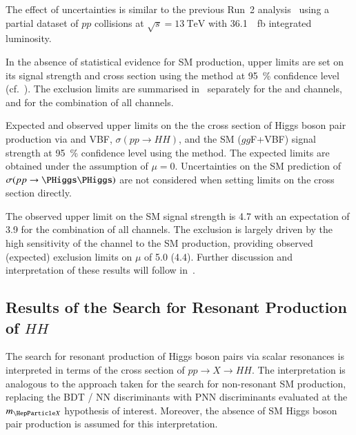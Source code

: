  The effect of
uncertainties is similar to the previous Run~2
analysis~\cite{HIGG-2016-16-witherratum} using a partial dataset of $pp$
collisions at $\sqrt{s} = \SI{13}{\TeV}$ with \SI{36.1}{\per\femto\barn}
integrated luminosity.

In the absence of statistical evidence for SM \HH production, upper limits are
set on its signal strength and cross section using the \CLs method at
\SI{95}{\percent} confidence level (cf.\ ). The exclusion
limits are summarised in~ separately for the
\lephad and \hadhad channels, and for the combination of all channels.

\begin{table}[htbp]
  \centering

  \caption{Expected and observed upper limits on the the cross section of Higgs
    boson pair production via \ggF and VBF, $\sigma(pp \to HH)$, and the SM \HH
    ($gg$F+VBF) signal strength at \SI{95}{\percent} confidence level using the
    \CLs method. The expected limits are obtained under the assumption of
    $\mu = 0$. Uncertainties on the SM prediction of $\sigma(pp \to \HH)$ are
    not considered when setting limits on the cross section directly.}%
  \label{tab:limits_non_resonant}

  
\end{table}

The observed upper limit on the SM \HH signal strength is \num{4.7} with an
expectation of \num{3.9} for the combination of all channels.  The exclusion is
largely driven by the high sensitivity of the \hadhad channel to the SM \HH
production, providing observed (expected) exclusion limits on $\mu$ of \num{5.0}
(\num{4.4}). Further discussion and interpretation of these results will follow
in~.


\subsection{Results of the Search for Resonant Production of $HH$}
\label{sec:results_res}

The search for resonant production of Higgs boson pairs via scalar resonances is
interpreted in terms of the cross section of $pp \to X \to HH$. The
interpretation is analogous to the approach taken for the search for
non-resonant SM \HH production, replacing the BDT / NN discriminants with PNN
discriminants evaluated at the $\mX$ hypothesis of interest. Moreover, the
absence of SM Higgs boson pair production is assumed for this interpretation.

